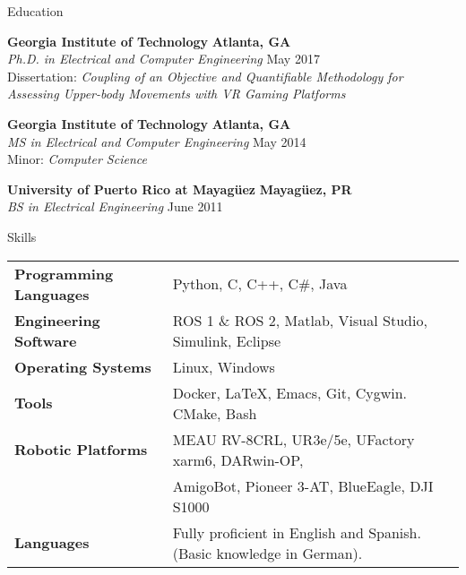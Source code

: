 \documentclass{resume} %
\newcommand{\sectionspace}{\vspace{3mm}}
\begin{document}

\sectionspace
\begin{rSection}{Education}

{\bf Georgia Institute of Technology} \hfill {\bf Atlanta, GA} \\
\textit{Ph.D. in Electrical and Computer Engineering} \hfill May 2017 \\
Dissertation: \textit{Coupling of an Objective and Quantifiable Methodology for Assessing Upper-body Movements with VR Gaming Platforms}

{\bf Georgia Institute of Technology} \hfill {\bf Atlanta, GA} \\
\textit{MS in Electrical and Computer Engineering} \hfill May 2014 \\ %
Minor: \textit{Computer Science}

{\bf University of Puerto Rico at Mayag\"{u}ez} \hfill {\bf Mayag\"{u}ez, PR} \\
\textit{BS in Electrical Engineering} \hfill June 2011 \\

\end{rSection}





\sectionspace
\begin{rSection}{Skills}

\begin{tabular}{ @{} >{\bfseries}l @{\hspace{6ex}} l }
Programming Languages & Python, C, C++, C\#, Java \\

Engineering Software & ROS 1 \& ROS 2, Matlab, Visual Studio, Simulink,
                       Eclipse \\ %

Operating Systems & Linux, Windows \\

Tools & Docker, \LaTeX, Emacs, Git, Cygwin. CMake, Bash \\

Robotic Platforms & MEAU RV-8CRL, UR3e/5e, UFactory xarm6, DARwin-OP, \\

\space & AmigoBot, Pioneer 3-AT, BlueEagle, DJI S1000  \\

Languages & Fully proficient in English and Spanish. (Basic knowledge in German).

\end{tabular}

\end{rSection}
\end{document}
